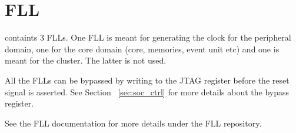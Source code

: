 \section{FLL}

\pulpissimo containts 3 FLLs. One FLL is meant for generating the clock for the peripheral domain, one for the core domain (core, memories, event unit etc) and one is meant for the cluster. The latter is not used.

All the FLLs can be bypassed by writing to the JTAG register before the reset signal is asserted. See Section ~\ref{sec:soc_ctrl} for more details about the bypass register.

See the FLL documentation for more details under the FLL repository.
